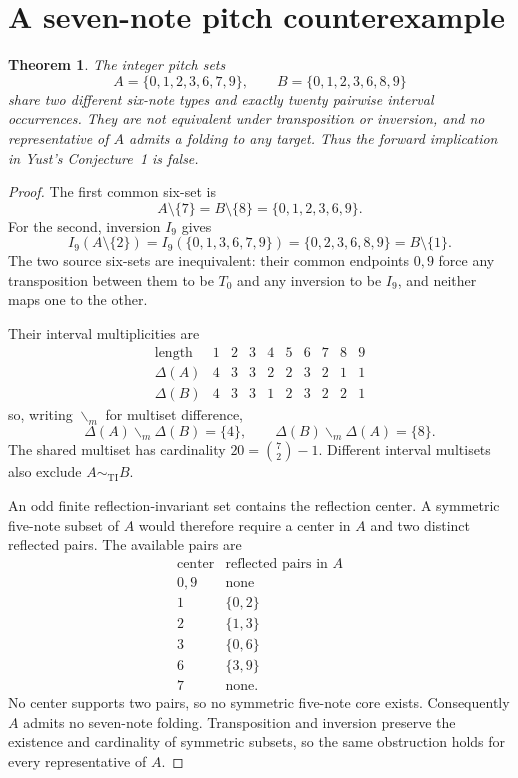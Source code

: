 \documentclass[10pt]{article}
\newtheorem{theorem}{Theorem}
\theoremstyle{remark}
\newcommand{\ti}{\sim_{\mathrm{TI}}}
\newcommand{\multdiff}{\mathbin{\backslash_{\!m}}}
\begin{document}
\section{A seven-note pitch counterexample}
\begin{theorem}\label{thm:pitch}
The integer pitch sets
\[
 A=\{0,1,2,3,6,7,9\},\qquad B=\{0,1,2,3,6,8,9\}
\]
share two different six-note types and exactly twenty pairwise interval
occurrences. They are not equivalent under transposition or inversion, and no
representative of $A$ admits a folding to any target. Thus the forward
implication in Yust's Conjecture~1 is false.
\end{theorem}
\begin{proof}
The first common six-set is
\[
 A\setminus\{7\}=B\setminus\{8\}=\{0,1,2,3,6,9\}.
\]
For the second, inversion $I_9$ gives
\[
 I_9(A\setminus\{2\})
 =I_9(\{0,1,3,6,7,9\})
 =\{0,2,3,6,8,9\}=B\setminus\{1\}.
\]
The two source six-sets are inequivalent: their common endpoints $0,9$
force any transposition between them to be $T_0$ and any inversion to be
$I_9$, and neither maps one to the other.

Their interval multiplicities are
\[
\begin{array}{c|rrrrrrrrr}
\text{length}&1&2&3&4&5&6&7&8&9\\\hline
\Delta(A)&4&3&3&2&2&3&2&1&1\\
\Delta(B)&4&3&3&1&2&3&2&2&1
\end{array}
\]
so, writing $\multdiff$ for multiset difference,
\[
 \Delta(A)\multdiff\Delta(B)=\{4\},\qquad
 \Delta(B)\multdiff\Delta(A)=\{8\}.
\]
The shared multiset has cardinality $20=\binom72-1$. Different interval
multisets also exclude $A\ti B$.

An odd finite reflection-invariant set contains the reflection center.
A symmetric five-note subset of $A$ would therefore require a center in $A$
and two distinct reflected pairs. The available pairs are
\[
\begin{array}{c|l}
\text{center}&\text{reflected pairs in }A\\\hline
0,9&\text{none}\\
1&\{0,2\}\\
2&\{1,3\}\\
3&\{0,6\}\\
6&\{3,9\}\\
7&\text{none}.
\end{array}
\]
No center supports two pairs, so no symmetric five-note core exists.
Consequently $A$ admits no seven-note folding. Transposition and inversion
preserve the existence and cardinality of symmetric subsets, so the same
obstruction holds for every representative of $A$.
\end{proof}
\end{document}

